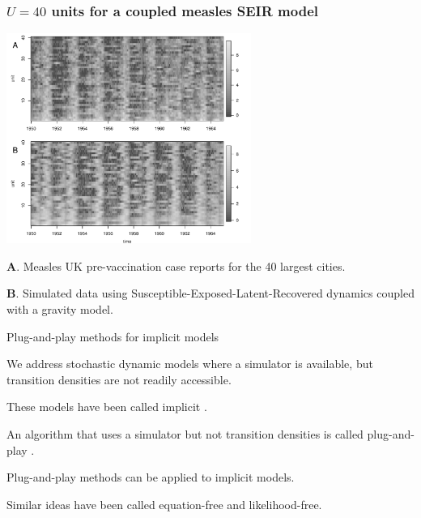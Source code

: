 \documentclass{beamer}
\begin{document}
\begin{frame}
\frametitle{$U=40$ units for a coupled measles SEIR model}

\vspace{-2.7mm}

\begin{center}
\includegraphics[width=8cm]{slice_image_plot-1.pdf}
\end{center}

\vspace{-3mm}

{\bf A}. Measles UK pre-vaccination case reports for the 40 largest cities.

{\bf B}. Simulated data using Susceptible-Exposed-Latent-Recovered dynamics coupled with a gravity model.



\end{frame}

\begin{frame}{Plug-and-play methods for implicit models}
  \begin{myitemize}
\item We address stochastic dynamic models where a simulator is available, but transition densities are not readily accessible.
\item These models have been called implicit \citep{diggle84}.
\item An algorithm that uses a simulator but not transition densities is called
plug-and-play \citep{breto09,he10}.
\item Plug-and-play methods can be applied to implicit models.
\item Similar ideas have been called equation-free and likelihood-free.
  \end{myitemize}

\end{frame}
\end{document}
